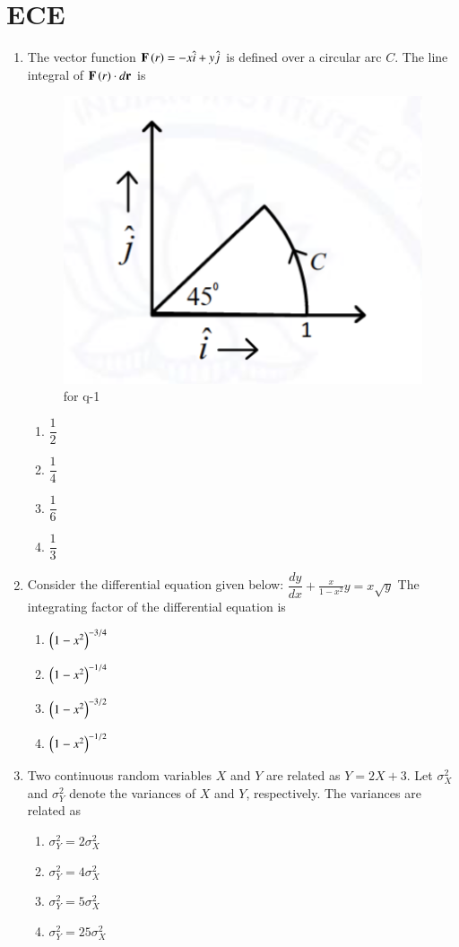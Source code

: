 \documentclass[journal,12pt,onecolumn]{IEEEtran}
\theoremstyle{remark}
\begin{document}
\section{ECE}
\begin{enumerate}
\item The vector function $\mathbf{F}\left(r\right) = -x\hat{i} + y\hat{j}$ is defined over a circular arc $C$. The line integral of $\mathbf{F}\left(r\right) \cdot d\mathbf{r}$ is
\begin{figure}[H]
    \centering
    \includegraphics[width=0.3\columnwidth]{figs/4.png}
    \caption{\centering for q-1}
    \label{fig:placeholder_4}
\end{figure}
\begin{multicols}{4}
\begin{enumerate}
\item $\dfrac{1}{2}$
\item $\dfrac{1}{4}$
\item $\dfrac{1}{6}$
\item $\dfrac{1}{3}$
\end{enumerate}
\end{multicols}
\hfill {}

\item Consider the differential equation given below:  
$\dfrac{dy}{dx} + \frac{x}{1 - x^2}y = x\sqrt{y}$  
The integrating factor of the differential equation is
\begin{multicols}{4}
\begin{enumerate}
\item $\left(1 - x^2\right)^{-3/4}$
\item $\left(1 - x^2\right)^{-1/4}$
\item $\left(1 - x^2\right)^{-3/2}$
\item $\left(1 - x^2\right)^{-1/2}$
\end{enumerate}
\end{multicols}
\hfill {}

\item Two continuous random variables $X$ and $Y$ are related as $Y = 2X + 3$. Let $\sigma_X^2$ and $\sigma_Y^2$ denote the variances of $X$ and $Y$, respectively. The variances are related as
\begin{multicols}{4}
\begin{enumerate}
\item $\sigma_Y^2 = 2\sigma_X^2$
\item $\sigma_Y^2 = 4\sigma_X^2$
\item $\sigma_Y^2 = 5\sigma_X^2$
\item $\sigma_Y^2 = 25\sigma_X^2$
\end{enumerate}
\end{multicols}
\hfill {}


\end{enumerate}
\end{document}
